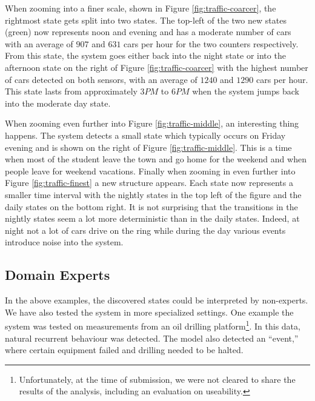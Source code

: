 When zooming into a finer scale, shown in Figure \ref{fig:traffic-coarcer}, the rightmost state gets split into two states. The top-left of the two new states (green) now represents noon and evening and has a moderate number of cars with an average of $907$ and $631$ cars per hour for the two counters respectively. From this state, the system goes either back into the night state or into the afternoon state on the right of Figure \ref{fig:traffic-coarcer} with the highest number of cars detected on both sensors, with an average of $1240$ and $1290$ cars per hour. This state lasts from approximately $3PM$ to $6PM$ when the system jumps back into the moderate day state.

When zooming even further into Figure \ref{fig:traffic-middle}, an interesting thing happens. The system detects a small state which typically occurs on Friday evening and is shown on the right of Figure \ref{fig:traffic-middle}. This is a time when most of the student leave the town and go home for the weekend and when people leave for weekend vacations.
Finally when zooming in even further into Figure \ref{fig:traffic-finest} a new structure appears. Each state now represents a smaller time interval with the nightly states in the top left of the figure and the daily states on the bottom right. It is not surprising that the transitions in the nightly states seem a lot more deterministic than in the daily states. Indeed, at night not a lot of cars drive on the ring while during the day various events introduce noise into the system.


\subsection{Domain Experts}
In the above examples, the discovered states could be interpreted by non-experts. We have also tested the system in more specialized settings. One example the system was tested on measurements from an oil drilling platform\footnote{Unfortunately, at the time of submission, we were not cleared to share the results of the analysis, including an evaluation on useability.}. In this data, natural recurrent behaviour was detected.  The model also detected an ``event,'' where certain equipment failed and drilling needed to be halted.  


